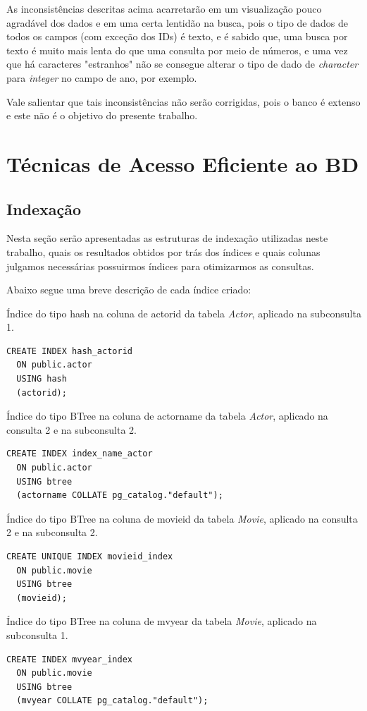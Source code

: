\documentclass[
	12pt,				%
	oneside,			%
	a4paper,			%
	brazil				%
	]{abntex2}
\begin{document}
As inconsistências descritas acima acarretarão em um visualização pouco agradável dos dados e em uma certa lentidão na busca, pois o tipo de dados de todos os campos (com exceção dos IDs) é texto, e é sabido que, uma busca por texto é muito mais lenta do que uma consulta por meio de números, e uma vez que há caracteres "estranhos"  não se consegue alterar o tipo de dado de \textit{character} para \textit{integer} no campo de ano, por exemplo. 

Vale salientar que tais inconsistências não serão corrigidas, pois o banco é extenso e este não é o objetivo do presente trabalho.

\newpage
\chapter{Técnicas de Acesso Eficiente ao BD}

\section{Indexação}
Nesta seção serão apresentadas as estruturas de indexação utilizadas neste trabalho, quais os resultados obtidos por trás dos índices e quais colunas julgamos necessárias possuirmos índices para otimizarmos as consultas.

Abaixo segue uma breve descrição de cada índice criado:

Índice do tipo hash na coluna de actorid da tabela \textit{Actor}, aplicado na subconsulta 1.

\begin{lstlisting}
CREATE INDEX hash_actorid
  ON public.actor
  USING hash
  (actorid);
\end{lstlisting}

Índice do tipo BTree na coluna de actorname da tabela \textit{Actor}, aplicado na consulta 2 e na subconsulta 2.
\begin{lstlisting}
CREATE INDEX index_name_actor
  ON public.actor
  USING btree
  (actorname COLLATE pg_catalog."default");
\end{lstlisting}

Índice do tipo BTree na coluna de movieid da tabela \textit{Movie}, aplicado na consulta 2 e na subconsulta 2.
\begin{lstlisting}
CREATE UNIQUE INDEX movieid_index
  ON public.movie
  USING btree
  (movieid);
\end{lstlisting}

Índice do tipo BTree na coluna de mvyear da tabela \textit{Movie}, aplicado na subconsulta 1.
\begin{lstlisting}
CREATE INDEX mvyear_index
  ON public.movie
  USING btree
  (mvyear COLLATE pg_catalog."default");
\end{lstlisting}
\end{document}
